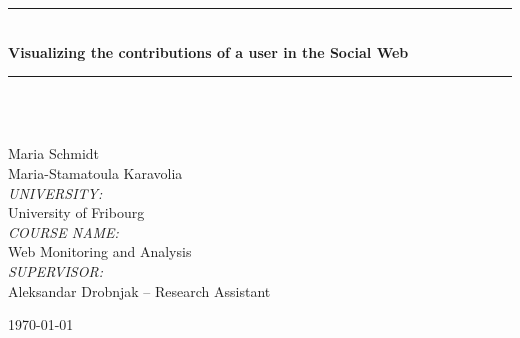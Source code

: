 \documentclass[a4paper,12pt]{article}
\begin{document}

\begin{titlepage}
\begin{center}


\rule{\linewidth}{0.5mm} \\[0.4cm]
{ \huge \bfseries Visualizing the contributions of a user in the Social Web \\[0.4cm] }
\rule{\linewidth}{0.5mm} \\[1.5cm]

\vspace{8cm}
\begin{minipage}{ 0.4 \textwidth}
\begin{flushleft} \small
{}\\
Maria Schmidt\\
Maria-Stamatoula Karavolia \\
\vspace{1cm}
\emph{UNIVERSITY:}\\
University of Fribourg\\ 
\emph{COURSE NAME:}\\
Web Monitoring and Analysis\\ 
\emph{SUPERVISOR:}\\
Aleksandar Drobnjak – Research Assistant\\
\end{flushleft}
\end{minipage}


\vfill

{\large \today}

\end{center}
\end{titlepage}

\tableofcontents

\clearpage
\listoffigures



\pagestyle{fancy}

\clearpage









\clearpage




\clearpage
\end{document}

